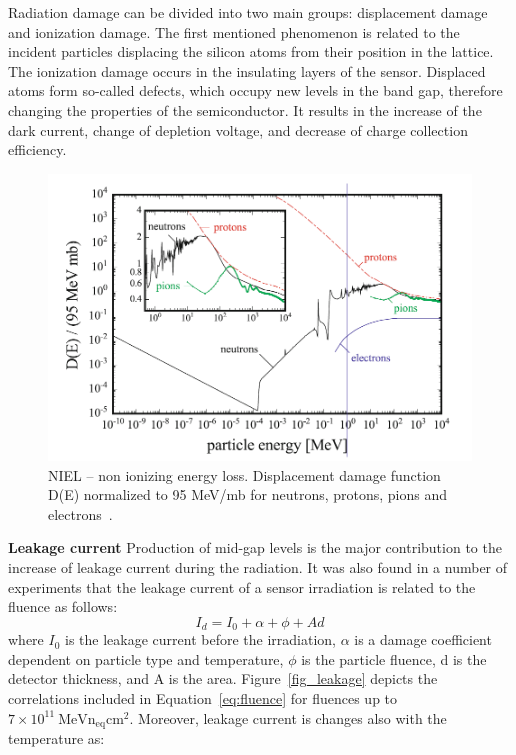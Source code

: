 Radiation damage can be divided into two main groups: displacement damage and ionization damage. The first mentioned phenomenon is related to the incident particles displacing the silicon atoms from their position in the lattice. The ionization damage occurs in the insulating layers of the sensor. Displaced atoms form so-called defects, which occupy new levels in the band gap, therefore changing the properties of the semiconductor. It results in the increase of the dark current, change of depletion voltage, and decrease of charge collection efficiency.


\begin{figure}[!h]
\centering
\includegraphics[width=0.75\columnwidth]{Chapter2/images/niel_silicons.png}
\caption{NIEL – non ionizing energy loss. Displacement damage function D(E) normalized to 95 MeV/mb for neutrons, protons, pions and electrons~\cite{Hartmann:2017gzy}.}
\label{fig_niel_si}
\end{figure}

\textbf{Leakage current}\bigbreak
Production of mid-gap levels is the major contribution to the increase of leakage current during the radiation. It was also found in a number of experiments that the leakage current of a sensor irradiation is related to the fluence as follows:
\begin{equation}
\label{eq:fluence}
    I_{d} = I_{0} + \alpha + \phi + Ad
\end{equation}
where $I_{0}$ is the leakage current before the irradiation, $\alpha$ is a damage coefficient dependent on particle type and temperature, $\phi$ is the particle fluence, d is the detector thickness, and A is the area. Figure~\ref{fig_leakage} depicts the correlations included in Equation~\ref{eq:fluence} for fluences up to $7\times 10^{11}~\mathrm{MeVn_{eq}cm^{2}}$. Moreover, leakage current is changes also with the temperature as:

